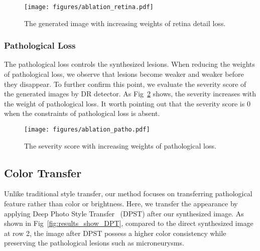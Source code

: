 \documentclass[letterpaper]{article} %
\begin{document}
	\begin{figure}[t]
		\begin{center}
			\texttt{[image: figures/ablation\_retina.pdf]}
		\end{center}
		\caption{The generated image with increasing weights of retina detail loss.}
		\label{fig:ablation_retina}
	\end{figure}
	
	
    
    \subsubsection{Pathological Loss}
    
    The pathological loss controls the synthesized lesions. When reducing the weights of pathological loss, we observe that lesions become weaker and weaker before they disappear. To further confirm this point, we evaluate the severity score of the generated images by DR detector. As Fig~\ref{fig:ablation_patho} shows, the severity increases with the weight of pathological loss. It worth pointing out that the severity score is $0$ when the constraints of pathological loss is absent. 
    
	
	\begin{figure}[h!]
		\begin{center}
			\texttt{[image: figures/ablation\_patho.pdf]}
		\end{center}
		\caption{The severity score with increasing weights of pathological loss.}
		\label{fig:ablation_patho}
	\end{figure}
	
	
    
        \subsection{Color Transfer}
        
        Unlike traditional style transfer,  our method focuses on transferring pathological feature rather than color or brightness. Here, we transfer the appearance by applying Deep Photo Style Transfer~\cite{DBLP:conf/cvpr/LuanPSB17} (DPST) after our synthesized image. As shown in Fig~\ref{fig:results_show_DPT}, compared to the direct synthesized image at row 2, the image after DPST possess a higher color consistency while preserving the  pathological lesions such as microneurysms.
        
\end{document}
